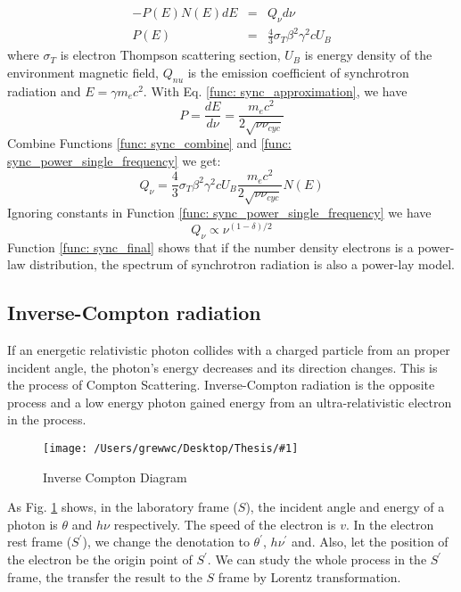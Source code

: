 \documentclass[12pt]{report}
\newcommand{\singleFig}[3]{
  \begin{figure}[!ht]
    \centering
    \texttt{[image: /Users/grewwc/Desktop/Thesis/\#1]}
    \caption{#3}
    \label{fig: #1}
  \end{figure}
}
\begin{document}
            \begin{eqnarray}
              \label{func: sync_power_single_frequency}
              -P\left(E\right)N\left(E\right)dE &=& Q_{\nu} d\nu\\
              P\left(E\right) &=& \frac{4}{3} \sigma_{T} \beta^2 \gamma^2 c U_B
            \end{eqnarray} 
            where $\sigma_{T}$ is electron Thompson scattering section, $U_B$ is energy 
            density of the environment magnetic field,  $Q_{nu}$ is the emission coefficient 
            of synchrotron radiation and $E=\gamma m_e c^2$. With Eq. 
            \ref{func: sync_approximation}, we have
            \begin{equation}
              \label{func: sync_combine}
              P = \frac{dE}{d\nu} = \frac{m_e c^2}{2\sqrt{\nu \nu_{cyc}}}
            \end{equation}
            Combine Functions \ref{func: sync_combine} and 
            \ref{func: sync_power_single_frequency} we get:
            \begin{equation}
              Q_{\nu} = \frac{4}{3} \sigma_{T} \beta^2 \gamma^2 c U_B \frac{m_e c^2}{2\sqrt{\nu \nu_{cyc}}} N\left(E\right)
            \end{equation}
            Ignoring constants in Function \ref{func: sync_power_single_frequency} we have 
            \begin{equation}
              \label{func: sync_final}
              Q_{\nu} \propto \nu^{(1-\delta)/2}
            \end{equation}
            Function \ref{func: sync_final} shows that if the number density electrons is 
            a power-law distribution, the spectrum of synchrotron radiation is also a 
            power-lay model.  
            
          \subsection{Inverse-Compton radiation}
            If an energetic relativistic photon collides with a charged particle from an 
            proper incident angle, the photon's energy decreases and its direction changes. 
            This is the process of Compton Scattering. Inverse-Compton radiation is the 
            opposite process and a low energy photon gained energy from an ultra-relativistic 
            electron in the process. 

            \singleFig{inverse_compton}{0.45}{Inverse Compton Diagram}
            As Fig. \ref{fig: inverse_compton} shows, in the laboratory frame ($S$), the 
            incident angle and energy of a photon is $\theta$ and $h \nu$ respectively. 
            The speed of the electron is $v$. In the electron rest frame ($S^{\prime}$), 
            we change the denotation to $\theta^{\prime}$, $h \nu^{\prime}$ and. Also, let 
            the position of the electron be the origin point of $S^{\prime}$. We can study 
            the whole process in the $S^{\prime}$ frame, the transfer the result to the $S$ 
            frame by Lorentz transformation. 
\end{document}
